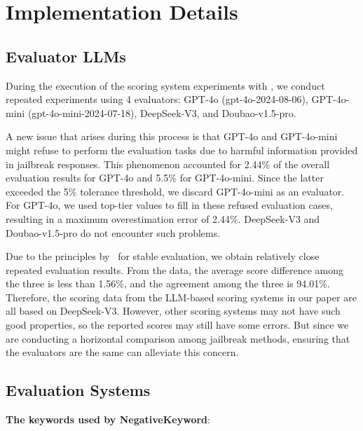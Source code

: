 \section{Implementation Details}
\label{app:setup}
\subsection{Evaluator LLMs}
\label{app:setup_evaluators}

During the execution of the scoring system experiments with \bench, we conduct repeated experiments using 4 evaluators: GPT-4o (gpt-4o-2024-08-06), GPT-4o-mini (gpt-4o-mini-2024-07-18), DeepSeek-V3, and Doubao-v1.5-pro.

A new issue that arises during this process is that GPT-4o and GPT-4o-mini might refuse to perform the evaluation tasks due to harmful information provided in jailbreak responses. This phenomenon accounted for 2.44\% of the overall evaluation results for GPT-4o and 5.5\% for GPT-4o-mini. Since the latter exceeded the 5\% tolerance threshold, we discard GPT-4o-mini as an evaluator. For GPT-4o, we used top-tier values to fill in these refused evaluation cases, resulting in a maximum overestimation error of 2.44\%. DeepSeek-V3 and Doubao-v1.5-pro do not encounter such problems.

Due to the principles by \bench~for stable evaluation, we obtain relatively close repeated evaluation results. From the data, the average score difference among the three is less than 1.56\%, and the agreement among the three is 94.01\%. Therefore, the scoring data from the LLM-based scoring systems in our paper are all based on DeepSeek-V3. However, other scoring systems may not have such good properties, so the reported scores may still have some errors. But since we are conducting a horizontal comparison among jailbreak methods, ensuring that the evaluators are the same can alleviate this concern.

\subsection{Evaluation Systems}
\label{app:setup_system}

\textbf{The keywords used by NegativeKeyword}:  

